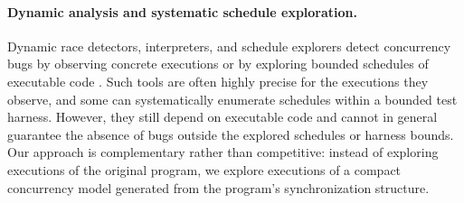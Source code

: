 \paragraph{Dynamic analysis and systematic schedule exploration.}
Dynamic race detectors, interpreters, and schedule explorers detect concurrency bugs by observing concrete executions or by exploring bounded schedules of executable code \cite{Godefroid1997VeriSoft,Flanagan2005DPOR,Musuvathi2008FairStateless,Musuvathi2008Heisenbugs,Burckhardt2010RandomizedScheduler}. Such tools are often highly precise for the executions they observe, and some can systematically enumerate schedules within a bounded test harness. However, they still depend on executable code and cannot in general guarantee the absence of bugs outside the explored schedules or harness bounds. Our approach is complementary rather than competitive: instead of exploring executions of the original program, we explore executions of a compact concurrency model generated from the program's synchronization structure.

